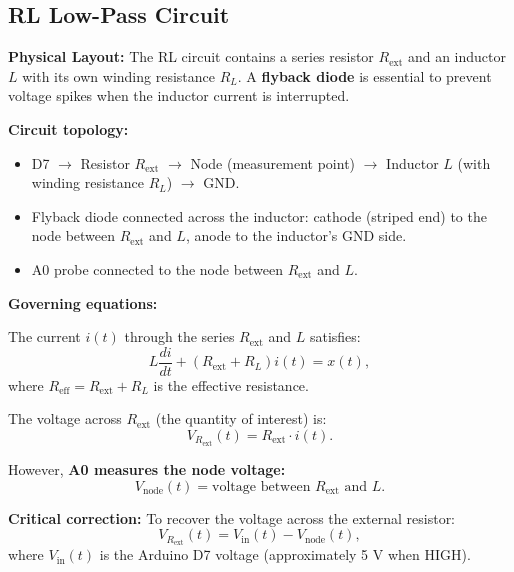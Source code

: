 \documentclass[11pt,letterpaper]{article}
\begin{document}
\subsection{RL Low-Pass Circuit}

\textbf{Physical Layout:} The RL circuit contains a series resistor $R_{\text{ext}}$ and an inductor $L$ with its own winding resistance $R_L$. A \textbf{flyback diode} is essential to prevent voltage spikes when the inductor current is interrupted.

\textbf{Circuit topology:}
\begin{itemize}
    \item D7 $\rightarrow$ Resistor $R_{\text{ext}}$ $\rightarrow$ Node (measurement point) $\rightarrow$ Inductor $L$ (with winding resistance $R_L$) $\rightarrow$ GND.
    \item Flyback diode connected across the inductor: cathode (striped end) to the node between $R_{\text{ext}}$ and $L$, anode to the inductor's GND side.
    \item A0 probe connected to the node between $R_{\text{ext}}$ and $L$.
\end{itemize}

\textbf{Governing equations:}

The current $i(t)$ through the series $R_{\text{ext}}$ and $L$ satisfies:
\begin{equation}
L \frac{di}{dt} + (R_{\text{ext}} + R_L) i(t) = x(t),
\end{equation}
where $R_{\text{eff}} = R_{\text{ext}} + R_L$ is the effective resistance.

The voltage across $R_{\text{ext}}$ (the quantity of interest) is:
\begin{equation}
V_{R_{\text{ext}}}(t) = R_{\text{ext}} \cdot i(t).
\end{equation}

\noindent
However, \textbf{A0 measures the node voltage:}
\begin{equation}
V_{\text{node}}(t) = \text{voltage between } R_{\text{ext}} \text{ and } L.
\end{equation}

\noindent
\textbf{Critical correction:} To recover the voltage across the external resistor:
\begin{equation}
V_{R_{\text{ext}}}(t) = V_{\text{in}}(t) - V_{\text{node}}(t),
\end{equation}
where $V_{\text{in}}(t)$ is the Arduino D7 voltage (approximately 5 V when HIGH).
\end{document}
